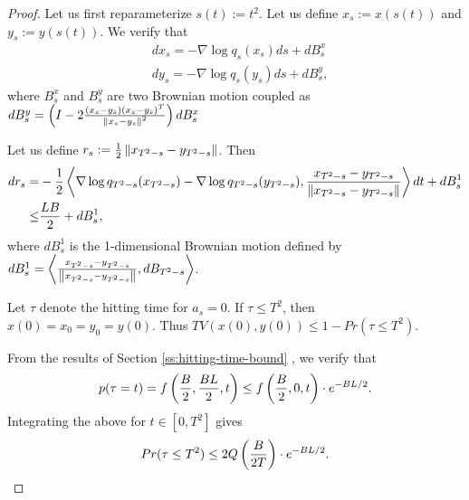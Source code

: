 \begin{proof}
    Let us first reparameterize $s(t) := t^2$. Let us define $x_s := x(s(t))$ and $y_s := y(s(t))$. We verify that
    \begin{align*}
        & dx_s = - \nabla \log q_s(x_s) ds + dB^x_s\\
        & dy_s = - \nabla \log q_s(y_s) ds + dB^y_s,
    \end{align*}
    where $B^x_s$ and $B^y_s$ are two Brownian motion coupled as $dB^y_s = \left( I - 2 \frac{(x_s-y_s)(x_s-y_s)^T}{\left\| x_s-y_s \right\|^2} \right) dB^x_s$

    Let us define $r_s := \frac{1}{2} \left\| x_{T^2-s} - y_{T^2-s} \right\|$. Then
    \begin{align*}
        d r_s 
        =& - \frac{1}{2} \left\langle \nabla \log q_{T^2-s}(x_{T^2-s}) - \nabla \log q_{T^2-s}(y_{T^2-s}), \frac{x_{T^2-s} - y_{T^2-s}}{\left\| x_{T^2-s} - y_{T^2-s} \right\|} \right\rangle dt + dB^1_s\\
        \leq& \frac{LB}{2} + dB^1_s,
    \end{align*}
    where $dB^1_s$ is the 1-dimensional Brownian motion defined by $dB^1_s = \left\langle \frac{x_{T^2-s} - y_{T^2-s}}{\left\| x_{T^2-s} - y_{T^2-s} \right\|}, dB_{T^2-s} \right\rangle$.
    
    Let $\tau$ denote the hitting time for $a_s=0$. If $\tau \leq T^2$, then $x(0) = x_0 = y_0 = y(0)$. Thus $TV(x(0),y(0)) \leq 1- Pr(\tau \leq T^2)$. 

    From the results of Section \ref{ss:hitting-time-bound} , we verify that
    \begin{align*}
        p(\tau = t) = f\left( \frac{B}{2}, \frac{BL}{2}, t \right) \leq f\left( \frac{B}{2}, 0, t \right) \cdot e^{-BL/2}.
    \end{align*}
    Integrating the above for $t\in[0,T^2]$ gives
    \begin{align*}
        Pr(\tau \leq T^2) \leq 2Q\left( \frac{B}{2T} \right) \cdot e^{-BL/2}.
    \end{align*}
    
\end{proof}

\fi


